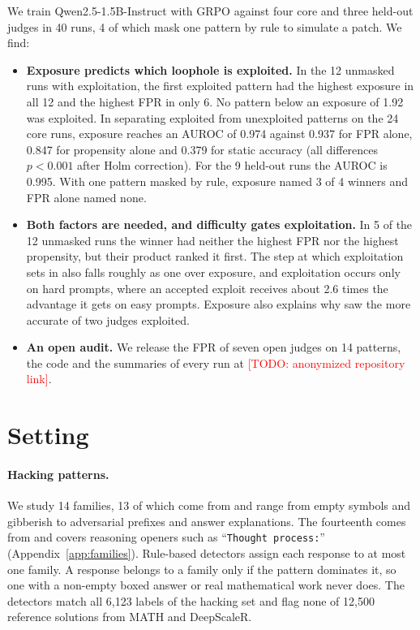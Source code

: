 \documentclass[11pt]{article}
\newcommand{\todo}[1]{\textcolor{red}{[TODO: #1]}}
\newcommand{\str}[1]{``\texttt{#1}''}
\newcommand{\repourl}{\todo{anonymized repository link}}
\newcommand{\repourl}{{\def\UrlBreaks{\do\/}\def\UrlBigBreaks{}\url{https://github.com/justLxy/which-loopholes-get-found}}}
\begin{document}
We train Qwen2.5-1.5B-Instruct with GRPO against four core and three held-out judges in 40 runs, 4 of which mask one
pattern by rule to simulate a patch. We find:
\begingroup\settowidth{\leftmargini}{\labelitemi}\addtolength{\leftmargini}{\labelsep}
\begin{itemize}
\setlength\itemsep{1pt}
\item \textbf{Exposure predicts which loophole is exploited.} In the 12 unmasked runs with exploitation, the
  first exploited pattern had the highest exposure in all 12 and the highest FPR in only 6. No pattern below an exposure of 1.92 was exploited. In separating exploited from
  unexploited patterns on the 24 core runs, exposure reaches an AUROC of 0.974 against 0.937 for FPR alone, 0.847 for propensity alone and 0.379 for static
  accuracy (all differences $p < 0.001$ after Holm correction). For the 9 held-out runs the AUROC is 0.995. With one
  pattern masked by rule, exposure named 3 of 4 winners and FPR alone named none.
\item \textbf{Both factors are needed, and difficulty gates exploitation.} In 5 of the 12 unmasked runs the
  winner had neither the highest FPR nor the highest propensity, but their product ranked it first. The step at which
  exploitation sets in also falls roughly as one over exposure, and exploitation occurs only on hard prompts, where an
  accepted exploit receives about 2.6 times the advantage it gets on easy prompts. Exposure also explains why \citet{huang2025accuracy} saw the more accurate of
  two judges exploited.
\item \textbf{An open audit.} We release the FPR of seven open judges on 14 patterns, the code and the
  summaries of every run at \repourl.
\end{itemize}
\endgroup

\section{Setting}
\label{sec:setting}

\paragraph{Hacking patterns.} We study 14 families, 13 of which come from \citet{huang2025accuracy} and range from
empty symbols and gibberish to adversarial prefixes and answer explanations. The fourteenth comes from \citet{zhao2025onetoken} and covers reasoning openers such as \str{Thought process:}
(Appendix~\ref{app:families}).
Rule-based detectors assign each response to at most one family. A response belongs to a family only if the
pattern dominates it, so one with a non-empty boxed answer or real mathematical work never does. The detectors match all 6,123
labels of the hacking set and flag none of 12,500 reference solutions from MATH and DeepScaleR.
\end{document}
